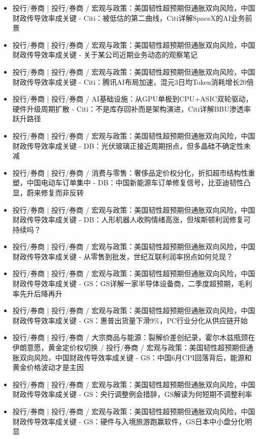 \documentclass[11pt]{ctexart}
\begin{document}
\begin{itemize}
  \item [R054] 投行/券商 | 投行/券商 / 宏观与政策：美国韧性超预期但通胀双向风险，中国财政传导效率成关键 - Citi：被低估的第二曲线，Citi详解SpaceX的AI业务前景
  \item [R055] 投行/券商 | 投行/券商 / 宏观与政策：美国韧性超预期但通胀双向风险，中国财政传导效率成关键 - 关于某公司近期业务动态的观察笔记
  \item [R056] 投行/券商 | 投行/券商 / 宏观与政策：美国韧性超预期但通胀双向风险，中国财政传导效率成关键 - Citi：腾讯AI布局加速，混元3日均Token消耗增长20倍
  \item [R057] 投行/券商 | 投行/券商 / AI基础设施：从GPU单极到CPU+ASIC双轮驱动，硬件升级周期扩散 - Citi：不是库存回补而是架构演进，Citi详解BBU渗透率跃升路径
  \item [R058] 投行/券商 | 投行/券商 / 宏观与政策：美国韧性超预期但通胀双向风险，中国财政传导效率成关键 - DB：光伏玻璃正接近周期拐点，但多晶硅不确定性未减
  \item [R059] 投行/券商 | 投行/券商 / 消费与零售：奢侈品定价权分化，折扣超市结构性重塑，中国电动车订单集中 - DB：中国新能源车订单修复信号，比亚迪韧性凸显，蔚来修复而非反转
  \item [R060] 投行/券商 | 投行/券商 / 宏观与政策：美国韧性超预期但通胀双向风险，中国财政传导效率成关键 - DB：人形机器人收购情绪高涨，但埃斯顿利润修复可持续吗？
  \item [R061] 投行/券商 | 投行/券商 / 宏观与政策：美国韧性超预期但通胀双向风险，中国财政传导效率成关键 - 从零售到批发，世纪互联利润率拐点如何兑现？
  \item [R062] 投行/券商 | 投行/券商 / 宏观与政策：美国韧性超预期但通胀双向风险，中国财政传导效率成关键 - GS：GS详解一家半导体设备商，二季度超预期，毛利率先升后降再升
  \item [R063] 投行/券商 | 投行/券商 / 宏观与政策：美国韧性超预期但通胀双向风险，中国财政传导效率成关键 - GS：惠普出货量下滑9\%，PC行业分化从供应链开始
  \item [R064] 投行/券商 | 投行/券商 / 大宗商品与能源：裂解价差创纪录，霍尔木兹瓶颈在伊朗意愿，黄金定价权切换 / 投行/券商 / 宏观与政策：美国韧性超预期但通胀双向风险，中国财政传导效率成关键 - GS：中国6月CPI回落背后，能源和黄金价格波动才是主因
  \item [R065] 投行/券商 | 投行/券商 / 宏观与政策：美国韧性超预期但通胀双向风险，中国财政传导效率成关键 - GS：央行调整例会措辞，GS解读为何短期不调整利率
  \item [R066] 投行/券商 | 投行/券商 / 宏观与政策：美国韧性超预期但通胀双向风险，中国财政传导效率成关键 - GS：硬件与入境旅游跑赢软件，GS日本中小盘分化明显

\end{itemize}
\end{document}
